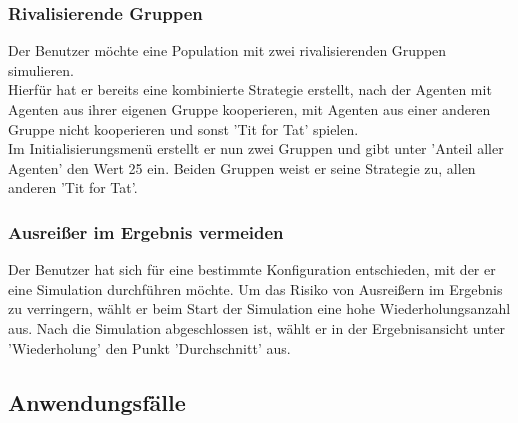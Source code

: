 \subsubsection{Rivalisierende Gruppen}
Der Benutzer möchte eine Population mit zwei rivalisierenden Gruppen simulieren.\\
Hierfür hat er bereits eine kombinierte Strategie erstellt, nach der Agenten mit Agenten aus ihrer eigenen Gruppe kooperieren, mit Agenten aus einer anderen Gruppe nicht kooperieren und sonst 'Tit for Tat' spielen.\\
Im Initialisierungsmenü erstellt er nun zwei Gruppen und gibt unter 'Anteil aller Agenten' den Wert 25 ein. Beiden Gruppen weist er seine Strategie zu, allen anderen 'Tit for Tat'.

\subsubsection{Ausreißer im Ergebnis vermeiden}
Der Benutzer hat sich für eine bestimmte Konfiguration entschieden, mit der er eine Simulation durchführen möchte. Um das Risiko von Ausreißern im Ergebnis zu verringern, wählt er beim Start der Simulation eine hohe Wiederholungsanzahl aus. Nach die Simulation abgeschlossen ist, wählt er in der Ergebnisansicht unter 'Wiederholung' den Punkt 'Durchschnitt' aus.

\newpage

\subsection{Anwendungsfälle}


